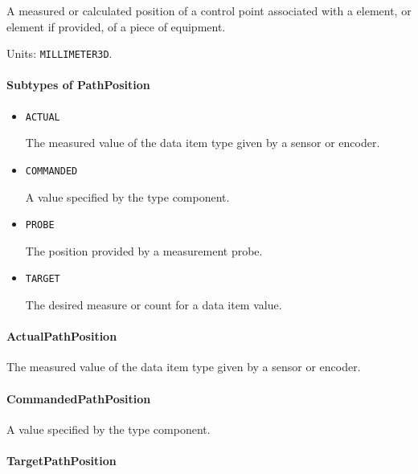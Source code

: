 A measured or calculated position of a control point associated with a  element, or  element if provided, of a piece of equipment.


Units: \texttt{MILLIMETER\textunderscore 3D}.

\paragraph{Subtypes of PathPosition}\mbox{}
\label{sec:Subtypes of PathPosition}

\begin{itemize}

\item \texttt{ACTUAL}


The measured value of the data item type given by a sensor or encoder.

\item \texttt{COMMANDED}


A value specified by the  type component.

\item \texttt{PROBE}


The position provided by a measurement probe.

\item \texttt{TARGET}


The desired measure or count for a data item value.


\end{itemize}

\paragraph{ActualPathPosition}\mbox{}
\label{sec:ActualPathPosition}


The measured value of the data item type given by a sensor or encoder.


\paragraph{CommandedPathPosition}\mbox{}
\label{sec:CommandedPathPosition}


A value specified by the  type component.


\paragraph{TargetPathPosition}\mbox{}
\label{sec:TargetPathPosition}


